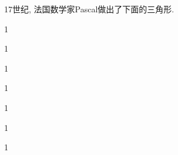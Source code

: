 \documentclass[10pt,punct]{ctexbeamer}
\begin{document}
\begin{frame}
    \begin{center}
        \begin{minipage}{0.55\linewidth}
            17世纪, 法国数学家Pascal做出了下面的三角形.
            \begin{table}[]
                \begin{center}
                    1

                    1 

                    1\quad	{}\quad	{}

                    1\quad	{}\quad{}\quad{}

                    1\quad	{} \quad{}\quad{}\quad {}

                    1\quad{}\quad{}\quad{}\quad{}\quad\quad	1

                    1\quad{}\quad{}\quad{}\quad{}\quad{}\quad{}


\end{center}
\end{table}
\end{minipage}
\end{center}
\end{frame}
\end{document}
